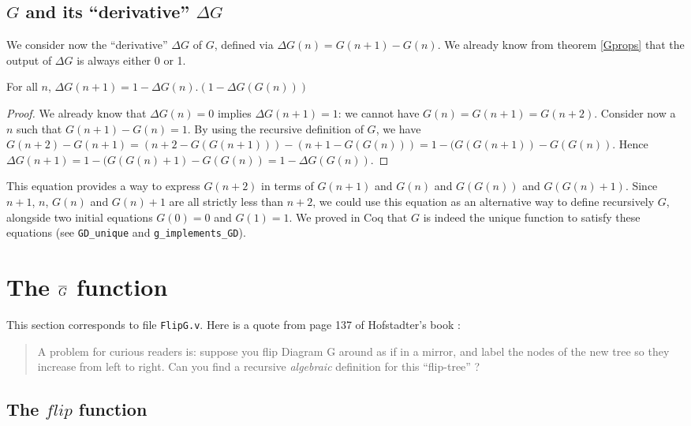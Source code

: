 \documentclass[a4paper,11pt]{article}
\begin{document}
\subsection{$G$ and its ``derivative'' $\Delta G$}

We consider now the ``derivative'' $\Delta G$ of $G$, defined via
$\Delta G(n) = G(n+1)-G(n)$. We already know from theorem
\ref{Gprops} that the output of $\Delta G$ is always either 0 or 1.

\begin{theorem}\label{Gdelta}
For all $n$, $\Delta G(n+1) = 1 - \Delta G(n).(1 - \Delta G(G(n)))$
\end{theorem}
\begin{proof}
We already know that $\Delta G(n)=0$ implies $\Delta G(n+1)=1$:
we cannot have $G(n)=G(n+1)=G(n+2)$.
Consider now a $n$ such that
$G(n+1)-G(n)=1$. By using the recursive definition of $G$, we have
$G(n+2)-G(n+1)=(n+2-G(G(n+1)))-(n+1-G(G(n))) = 1 - (G(G(n+1))-G(G(n))$.
Hence $\Delta G(n+1) = 1 - (G(G(n)+1)-G(G(n)) = 1 - \Delta G(G(n))$.
\end{proof}

This equation provides a way to express $G(n+2)$ in terms of
$G(n+1)$ and $G(n)$ and $G(G(n))$ and $G(G(n)+1)$. Since
$n+1$, $n$, $G(n)$ and $G(n)+1$ are all strictly less than $n+2$,
we could use this equation as an alternative way to define
recursively $G$,
alongside two initial equations $G(0)=0$ and $G(1)=1$.
We proved in Coq that $G$ is indeed the unique function to
satisfy these equations (see {\tt GD\_unique} and
{\tt  g\_implements\_GD}).

\section{The $\overline{G}$ function}

This section corresponds to file {\tt FlipG.v}.
Here is a quote from page 137 of Hofstadter's book \cite{??}:
\begin{quote}
A problem for curious readers is: suppose you flip Diagram G
around as if in a mirror, and label the nodes of the new tree so they
increase from left to right. Can you find a recursive \emph{algebraic}
definition for this ``flip-tree'' ?
\end{quote}

\subsection*{The $flip$ function}
\end{document}
